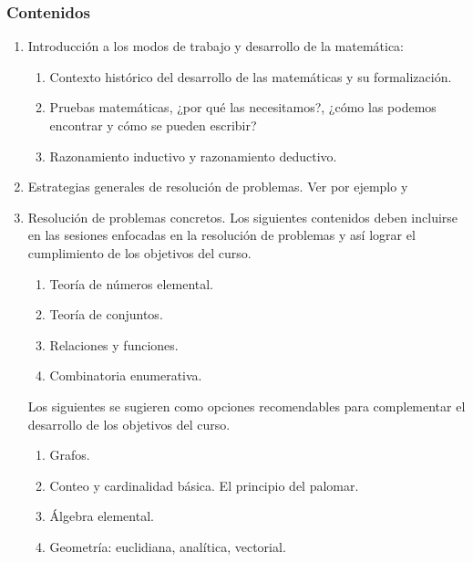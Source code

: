 \begin{refsection}
\subsubsection*{Contenidos}

\begin{enumerate}
\item Introducción a los modos de trabajo y desarrollo de la matemática: 
    \begin{enumerate}
        \item Contexto histórico del desarrollo de las matemáticas y su formalización.
        \item Pruebas matemáticas, ¿por qué las necesitamos?, ¿cómo las podemos encontrar y cómo se pueden escribir?
     \item Razonamiento inductivo y razonamiento deductivo.
    \end{enumerate}

\item Estrategias generales de resolución de problemas. Ver por ejemplo \cite{Pol14} y \cite[Capítulo 6]{Gri18}

\item Resolución de problemas concretos. Los siguientes contenidos deben incluirse en las sesiones enfocadas en la resolución de problemas y así lograr el cumplimiento de los objetivos del curso.
    \begin{enumerate}
        \item Teoría de números elemental.
        \item Teoría de conjuntos.
        \item Relaciones y funciones.
        \item Combinatoria enumerativa.
    \end{enumerate}

Los siguientes se sugieren como opciones recomendables para complementar el desarrollo de los objetivos del curso.
    \begin{enumerate}
        \item Grafos.
        \item Conteo y cardinalidad básica. El principio del palomar.
        \item Álgebra elemental.
        \item Geometría: euclidiana, analítica, vectorial.
    \end{enumerate}


\end{enumerate}
\end{refsection}
